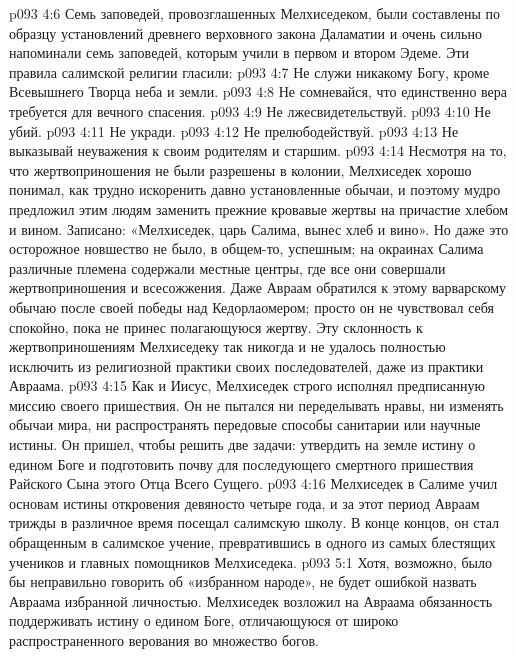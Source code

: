 \vs p093 4:6 \pc Семь заповедей, провозглашенных Мелхиседеком, были составлены по образцу установлений древнего верховного закона Даламатии и очень сильно напоминали семь заповедей, которым учили в первом и втором Эдеме. Эти правила салимской религии гласили:
\vs p093 4:7 \bibnobreakspace Не служи никакому Богу, кроме Всевышнего Творца неба и земли.
\vs p093 4:8 \bibnobreakspace Не сомневайся, что единственно вера требуется для вечного спасения.
\vs p093 4:9 \bibnobreakspace Не лжесвидетельствуй.
\vs p093 4:10 \bibnobreakspace Не убий.
\vs p093 4:11 \bibnobreakspace Не укради.
\vs p093 4:12 \bibnobreakspace Не прелюбодействуй.
\vs p093 4:13 \bibnobreakspace Не выказывай неуважения к своим родителям и старшим.
\vs p093 4:14 \pc Несмотря на то, что жертвоприношения не были разрешены в колонии, Мелхиседек хорошо понимал, как трудно искоренить давно установленные обычаи, и поэтому мудро предложил этим людям заменить прежние кровавые жертвы на причастие хлебом и вином. Записано: «Мелхиседек, царь Салима, вынес хлеб и вино». Но даже это осторожное новшество не было, в общем\hyp{}то, успешным; на окраинах Салима различные племена содержали местные центры, где все они совершали жертвоприношения и всесожжения. Даже Авраам обратился к этому варварскому обычаю после своей победы над Кедорлаомером; просто он не чувствовал себя спокойно, пока не принес полагающуюся жертву. Эту склонность к жертвоприношениям Мелхиседеку так никогда и не удалось полностью исключить из религиозной практики своих последователей, даже из практики Авраама.
\vs p093 4:15 Как и Иисус, Мелхиседек строго исполнял предписанную миссию своего пришествия. Он не пытался ни переделывать нравы, ни изменять обычаи мира, ни распространять передовые способы санитарии или научные истины. Он пришел, чтобы решить две задачи: утвердить на земле истину о едином Боге и подготовить почву для последующего смертного пришествия Райского Сына этого Отца Всего Сущего.
\vs p093 4:16 \pc Мелхиседек в Салиме учил основам истины откровения девяносто четыре года, и за этот период Авраам трижды в различное время посещал салимскую школу. В конце концов, он стал обращенным в салимское учение, превратившись в одного из самых блестящих учеников и главных помощников Мелхиседека.
\vs p093 5:1 Хотя, возможно, было бы неправильно говорить об «избранном народе», не будет ошибкой назвать Авраама избранной личностью. Мелхиседек возложил на Авраама обязанность поддерживать истину о едином Боге, отличающуюся от широко распространенного верования во множество богов.
